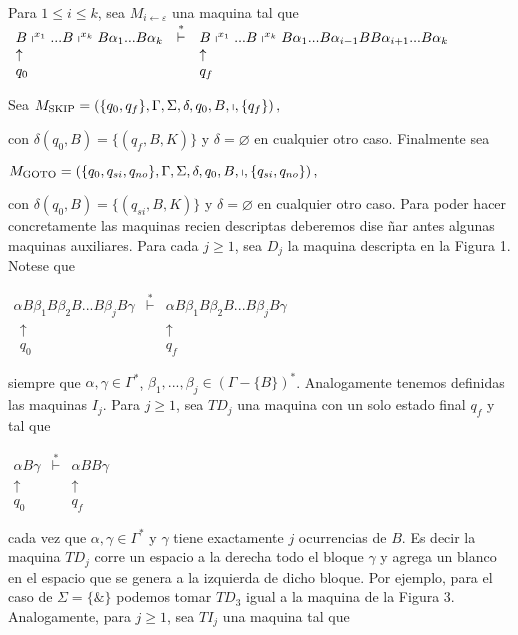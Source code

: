 Para \(1\leq i\leq k\), sea \(M_{i\leftarrow \varepsilon }\) una maquina tal que
\(\displaystyle \begin{array}{lcl} B\shortmid ^{x_{1}}...B\shortmid ^{x_{k}}B\alpha _{1}...B\alpha _{k} & \overset{\ast }{\vdash } & B\shortmid ^{x_{1}}...B\shortmid ^{x_{k}}B\alpha _{1}...B\alpha _{i-1}BB\alpha _{i+1}...B\alpha _{k} \\ \uparrow & & \uparrow \\ q_{0} & & q_{f} \end{array} \)

Sea
\(\displaystyle M_{\mathrm{SKIP}}=\left( \{q_{0},q_{f}\},\Gamma ,\Sigma ,\delta ,q_{0},B,\shortmid ,\{q_{f}\}\right) , \)

con \(\delta (q_{0},B)=\{(q_{f},B,K)\}\) y \(\delta =\varnothing \) en cualquier otro caso.
Finalmente sea

\(\displaystyle M_{\mathrm{GOTO}}=\left( \{q_{0},q_{si},q_{no}\},\Gamma ,\Sigma ,\delta ,q_{0},B,\shortmid ,\{q_{si},q_{no}\}\right) , \)

con \(\delta (q_{0},B)=\{(q_{si},B,K)\}\) y \(\delta =\varnothing \) en cualquier otro caso.
Para poder hacer concretamente las maquinas recien descriptas deberemos dise \~{n}ar antes algunas maquinas auxiliares. Para cada \(j\geq 1\), sea \(D_{j}\) la maquina descripta en la Figura 1. Notese que

\(\displaystyle \begin{array}{lcr} \alpha B\beta _{1}B\beta _{2}B...B\beta _{j}B\gamma & \overset{\ast }{\vdash } & \alpha B\beta _{1}B\beta _{2}B...B\beta _{j}B\gamma \\ \ \ \uparrow & & \uparrow \ \ \\ \ \ q_{0} & & q_{f}\ \ \end{array} \)

siempre que \(\alpha ,\gamma \in \Gamma ^{\ast }\), \(\beta _{1},...,\beta _{j}\in (\Gamma -\{B\})^{\ast }\). Analogamente tenemos definidas las maquinas \(I_{j}.\)
Para \(j\geq 1\), sea \(TD_{j}\) una maquina con un solo estado final \(q_{f}\) y tal que

\(\displaystyle \begin{array}{ccc} \alpha B\gamma & \overset{\ast }{\vdash } & \alpha BB\gamma \\ \uparrow & & \uparrow \ \ \\ q_{0} & & q_{f}\ \ \end{array} \)

cada vez que \(\alpha ,\gamma \in \Gamma ^{\ast }\) y \(\gamma \) tiene exactamente \(j\) ocurrencias de \(B\). Es decir la maquina \(TD_{j}\) corre un espacio a la derecha todo el bloque \(\gamma \) y agrega un blanco en el espacio que se genera a la izquierda de dicho bloque. Por ejemplo, para el caso de \(\Sigma =\{\& \}\) podemos tomar \(TD_{3}\) igual a la maquina de la Figura 3.
Analogamente, para \(j\geq 1\), sea \(TI_{j}\) una maquina tal que

